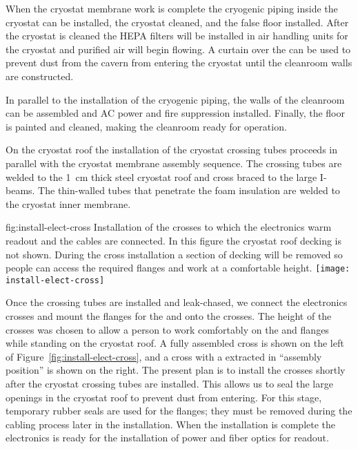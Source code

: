 When the cryostat membrane work is complete the cryogenic piping inside the cryostat can be installed, the cryostat cleaned, and the false floor installed. After the cryostat is cleaned the HEPA filters will be installed in air handling units for the cryostat and purified air will begin flowing. A curtain over the  can be used to prevent dust from the cavern from entering the cryostat until the cleanroom walls are constructed.

In parallel to the installation of the cryogenic piping, the walls of the cleanroom can be assembled and AC power and fire suppression installed. Finally, the floor is painted and 
cleaned, making the cleanroom ready for operation.



On the cryostat roof the installation of the cryostat crossing tubes proceeds in parallel with the cryostat membrane assembly sequence. 
The crossing tubes are welded to the \SI{1}{cm} thick steel cryostat roof and cross braced to the large I-beams. 
The thin-walled tubes that penetrate the foam insulation are welded to the cryostat inner membrane.


\begin{dunefigure}{fig:install-elect-cross}
  {Installation of the crosses to which the  electronics warm readout and the  cables are connected. In this figure the cryostat roof decking is not shown. During the cross installation a section of decking will be removed so people can access the required flanges and work at a comfortable height.  }
 \texttt{[image: install-elect-cross]}
\end{dunefigure}



Once the crossing tubes are installed and leak-chased, we connect the   electronics crosses and mount  the  \fdth flanges for the  and  onto the crosses. 
The height of the crosses was chosen to allow a person to work comfortably on the   and  flanges while standing on the cryostat roof. 
A fully assembled cross is shown on the left of Figure~\ref{fig:install-elect-cross}, and a cross with a  extracted in ``assembly position'' is shown on the right. 
The present plan is to install the crosses shortly after the cryostat crossing tubes are installed. 
This allows us to seal the large openings in the cryostat roof to prevent dust from entering.
For this stage, temporary rubber seals are used for the flanges; they must be removed during the cabling process later in the installation. 
When the  installation is complete the  electronics is ready for the installation of power and fiber optics for readout. 

